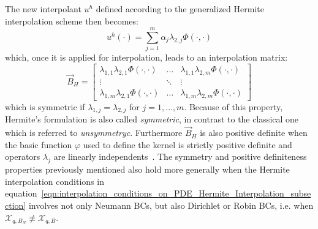 The new interpolant $u^h$ defined according to the generalized Hermite interpolation scheme then becomes:
\begin{equation}
	\label{eqn:pure_Hermite_interpolant}
	u^h(\cdot) = \sum_{j=1}^{m} \alpha_j \lambda_{2,j} \Phi(\cdot,\cdot)
\end{equation}
which, once it is applied for interpolation, leads to an interpolation matrix:
\begin{equation}
	\vec{B}_H =
	\begin{bmatrix}
		\lambda_{1,1} \lambda_{2,1} \Phi(\cdot, \cdot)  &  \dots  & \lambda_{1,1} \lambda_{2,m} \Phi(\cdot, \cdot)  \\
		\vdots											& \ddots  & \vdots											\\
		\lambda_{1,m} \lambda_{2,1} \Phi(\cdot, \cdot)  &  \dots  & \lambda_{1,m} \lambda_{2,m} \Phi(\cdot, \cdot)
	\end{bmatrix}
\end{equation}
which is symmetric if $\lambda_{1,j} = \lambda_{2,j}$ for $j = 1, \dots, m$. Because of this property, Hermite's formulation is also called \emph{symmetric}, in contrast to the classical one which is referred to \emph{unsymmetryc}. Furthermore $\vec{B}_H$ is also positive definite when the basic function $\varphi$ used to define the kernel is strictly positive definite and operators $\lambda_j$ are linearly independents~\cite{Miotti:phd_thesis}.
The symmetry and positive definiteness properties previously mentioned also hold more generally when the Hermite interpolation conditions in equation~\eqref{eqn:interpolation_conditions_on_PDE_Hermite_Interpolation_subsection} involves not only Neumann BCs, but also Dirichlet or Robin BCs, i.e. when $\mathcal{X}_{q,B_N} \not\equiv \mathcal{X}_{q,B}$.

